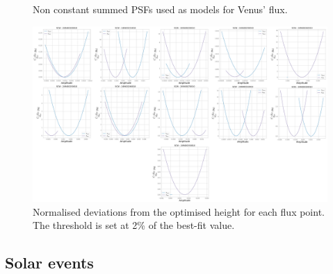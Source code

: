 \begin{figure}[H]
\begin{subfigure}{.45\textwidth}
        \end{subfigure}
        \caption{Non constant summed PSFs used as models for Venus' flux.}
        \label{model_psf_notconst}
        \end{figure}

        \begin{figure}[H]
        \centering
        \includegraphics[width = \textwidth]{report/Figures/models/2204/threshold_determination_notconst.png}
        \caption{Normalised deviations from the optimised height for each flux point. The threshold is set at 2\% of the best-fit value.}
        \label{threshold}
        \end{figure}

    
    
    \subsection{Solar events}
    
